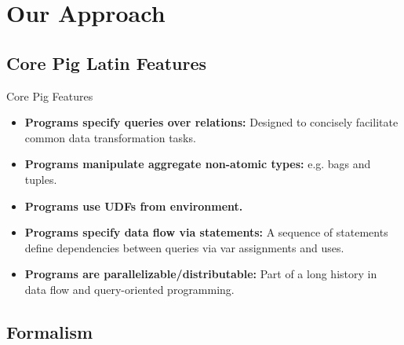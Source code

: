 \section{Our Approach}

\subsection{Core Pig Latin Features}
\begin{frame}{Core Pig Features}
\begin{itemize}
	\item \textbf{Programs specify queries over relations:} Designed to
	concisely facilitate common data transformation tasks.
	\item \textbf{Programs manipulate aggregate non-atomic types:} e.g. bags
	and tuples.
	\item \textbf{Programs use UDFs from environment.}
	\item \textbf{Programs specify data flow via statements:} A sequence of
	statements define dependencies between queries via var assignments and uses.
	\item \textbf{Programs are parallelizable/distributable:} Part of a long
	history in data flow and query-oriented programming.
\end{itemize}
\end{frame}

\subsection{Formalism}

